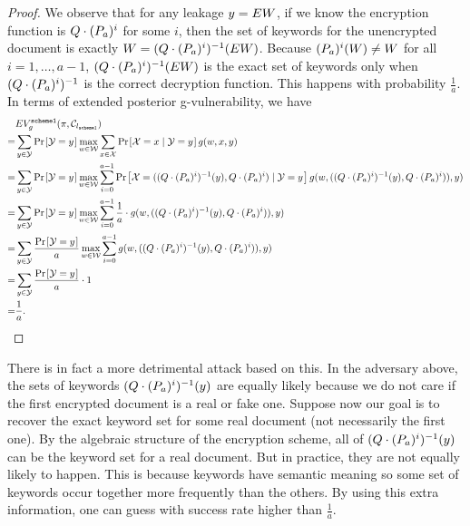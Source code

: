 \begin{proof}
We observe that for any leakage $y = EW$, if we know the encryption function is $Q \cdot (P_a)^i$ for some $i$, then the set of keywords for the unencrypted document is exactly $W = (Q \cdot (P_a)^i)^{-1}(EW)$. Because $(P_a)^i(W) \neq W$ for all $i = 1, \dots, a-1$, $(Q \cdot (P_a)^i)^{-1}(EW)$ is the exact set of keywords only when $(Q \cdot (P_a)^i)^{-1}$ is the correct decryption function. This happens with probability $\frac{1}{a}$. In terms of extended posterior g-vulnerability, we have
\begin{align*}
  &EV_g^{\texttt{scheme1}}(\pi, \channel_{\leak_\texttt{scheme1}})\\
= &\sum_{y \in {\mathcal{Y}}} \prob{\mathcal{Y} = y} \max_{w \in {\mathcal{W}}} \sum_{x \in {\mathcal{X}}} \prob{\mathcal{X} = x \mid \mathcal{Y} = y} g(w, x, y)\\
= &\sum_{y \in {\mathcal{Y}}} \prob{\mathcal{Y} = y} \max_{w \in {\mathcal{W}}} \sum_{i = 0}^{a-1} \prob{\mathcal{X} = ((Q \cdot (\perm_a)^i)^{-1}(y), Q \cdot (\perm_a)^i) \mid \mathcal{Y} = y} g(w, ((Q \cdot (\perm_a)^i)^{-1}(y), Q \cdot (\perm_a)^i)), y)\\
= &\sum_{y \in {\mathcal{Y}}} \prob{\mathcal{Y} = y} \max_{w \in {\mathcal{W}}} \sum_{i = 0}^{a-1} \frac{1}{a} \cdot g(w, ((Q \cdot (\perm_a)^i)^{-1}(y), Q \cdot (\perm_a)^i)), y)\\
= &\sum_{y \in {\mathcal{Y}}} \frac{\prob{\mathcal{Y} = y}}{a} \max_{w \in {\mathcal{W}}} \sum_{i = 0}^{a-1} g(w, ((Q \cdot (\perm_a)^i)^{-1}(y), Q \cdot (\perm_a)^i)), y)\\
= &\sum_{y \in {\mathcal{Y}}} \frac{\prob{\mathcal{Y} = y}}{a} \cdot 1 \\
= & \frac{1}{a}.
\end{align*}
\end{proof}


There is in fact a more detrimental attack based on this. In the adversary above, the sets of keywords $(Q \cdot (P_a)^i)^{-1}(y)$ are equally likely because we do not care if the first encrypted document is a real or fake one. Suppose now our goal is to recover the exact keyword set for some real document (not necessarily the first one). By the algebraic structure of the encryption scheme, all of $(Q \cdot (P_a)^i)^{-1}(y)$ can be the keyword set for a real document. But in practice, they are not equally likely to happen. This is because keywords have semantic meaning so some set of keywords occur together more frequently than the others. By using this extra information, one can guess with success rate higher than $\frac{1}{a}$.




